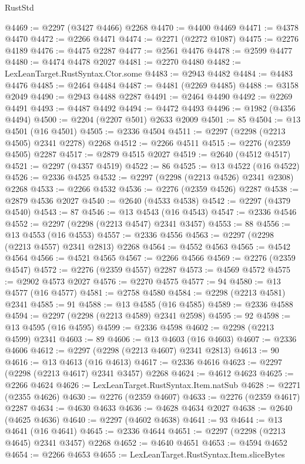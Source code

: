 \begin{lexlean}{RustStd}
\begin{coremodule}
@4469 := @2297 (@3427 @4466) @2268
@4470 := @4400 @4469
@4471 := @4378 @4470
@4472 := @2266 @4471
@4474 := @2271 (@2272 @1087)
@4475 := @2276 @4189
@4476 := @4475 @2287
@4477 := @2561 @4476
@4478 := @2599 @4477
@4480 := @4474 @4478 @2027
@4481 := @2270 @4480
@4482 := LexLeanTarget.RustSyntax.Ctor.some
@4483 := @2943 @4482
@4484 := @4483 @4476
@4485 := @2464 @4484
@4487 := @4481 (@2269 @4485)
@4488 := @3158 @2049
@4490 := @2943 @4488 @2287
@4491 := @2464 @4490
@4492 := @2269 @4491
@4493 := @4487 @4492
@4494 := @4472 @4493
@4496 := @1982 (@4356 @4494)
@4500 := @2204 (@2207 @501) @2633 @2009
@4501 := 85
@4504 := @13 @4501 (@16 @4501)
@4505 := @2336 @4504
@4511 := @2297 (@2298 (@2213 @4505) @2341 @2278) @2268
@4512 := @2266 @4511
@4515 := @2276 (@2359 @4505) @2287
@4517 := @2879 @4515 @2027
@4519 := @2640 (@4512 @4517)
@4521 := @2297 (@4357 @4519)
@4522 := 86
@4525 := @13 @4522 (@16 @4522)
@4526 := @2336 @4525
@4532 := @2297 (@2298 (@2213 @4526) @2341 @2308) @2268
@4533 := @2266 @4532
@4536 := @2276 (@2359 @4526) @2287
@4538 := @2879 @4536 @2027
@4540 := @2640 (@4533 @4538)
@4542 := @2297 (@4379 @4540)
@4543 := 87
@4546 := @13 @4543 (@16 @4543)
@4547 := @2336 @4546
@4552 := @2297 (@2298 (@2213 @4547) @2341 @3457)
@4553 := 88
@4556 := @13 @4553 (@16 @4553)
@4557 := @2336 @4556
@4563 := @2297 (@2298 (@2213 @4557) @2341 @2813) @2268
@4564 := @4552 @4563
@4565 := @4542 @4564
@4566 := @4521 @4565
@4567 := @2266 @4566
@4569 := @2276 (@2359 @4547)
@4572 := @2276 (@2359 @4557) @2287
@4573 := @4569 @4572
@4575 := @2902 @4573 @2027
@4576 := @2270 @4575
@4577 := 94
@4580 := @13 @4577 (@16 @4577)
@4581 := @2758 @4580
@4584 := @2298 (@2213 @4581) @2341
@4585 := 91
@4588 := @13 @4585 (@16 @4585)
@4589 := @2336 @4588
@4594 := @2297 (@2298 (@2213 @4589) @2341 @2598)
@4595 := 92
@4598 := @13 @4595 (@16 @4595)
@4599 := @2336 @4598
@4602 := @2298 (@2213 @4599) @2341
@4603 := 89
@4606 := @13 @4603 (@16 @4603)
@4607 := @2336 @4606
@4612 := @2297 (@2298 (@2213 @4607) @2341 @2813)
@4613 := 90
@4616 := @13 @4613 (@16 @4613)
@4617 := @2336 @4616
@4623 := @2297 (@2298 (@2213 @4617) @2341 @3457) @2268
@4624 := @4612 @4623
@4625 := @2266 @4624
@4626 := LexLeanTarget.RustSyntax.Item.natSub
@4628 := @2271 (@2355 @4626)
@4630 := @2276 (@2359 @4607)
@4633 := @2276 (@2359 @4617) @2287
@4634 := @4630 @4633
@4636 := @4628 @4634 @2027
@4638 := @2640 (@4625 @4636)
@4640 := @2297 (@4602 @4638)
@4641 := 93
@4644 := @13 @4641 (@16 @4641)
@4645 := @2336 @4644
@4651 := @2297 (@2298 (@2213 @4645) @2341 @3457) @2268
@4652 := @4640 @4651
@4653 := @4594 @4652
@4654 := @2266 @4653
@4655 := LexLeanTarget.RustSyntax.Item.sliceBytes

\end{coremodule}
\end{lexlean}
